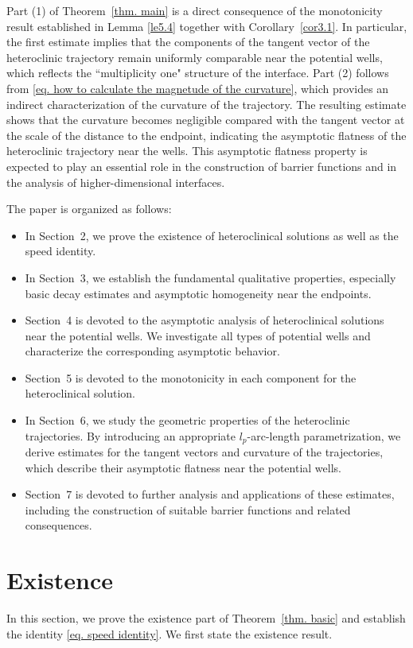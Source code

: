 \documentclass[11pt,twoside,reqno]{amsart}
\numberwithin{equation}{section}
\begin{document}
Part (1) of Theorem~\ref{thm. main} is a direct consequence of the monotonicity result established in Lemma \ref{le5.4} together with Corollary~\ref{cor3.1}. In particular, the first estimate implies that the components of the tangent vector of the heteroclinic trajectory remain uniformly comparable near the potential wells, which reflects the ``multiplicity one" structure of the interface. Part (2) follows from \eqref{eq. how to calculate the magnetude of the curvature}, which provides an indirect characterization of the curvature of the trajectory. The resulting estimate shows that the curvature becomes negligible compared with the tangent vector at the scale of the distance to the endpoint, indicating the asymptotic flatness of the heteroclinic trajectory near the wells. This asymptotic flatness property is expected to play an essential role in the construction of barrier functions and in the analysis of higher-dimensional interfaces.

The paper is organized as follows:
\begin{itemize}
    \item In Section~2, we prove the existence of heteroclinical solutions as well as the speed identity.
    \item In Section~3, we establish the fundamental qualitative properties, especially basic decay estimates and asymptotic homogeneity near the endpoints.
    \item Section~4 is devoted to the asymptotic analysis of heteroclinical solutions near the potential wells. We investigate all types of potential wells and characterize the corresponding asymptotic behavior.
    \item Section~5 is devoted to the monotonicity in each component for the heteroclinical solution.
    \item In Section~6, we study the geometric properties of the heteroclinic trajectories. By introducing an appropriate $l_p$-arc-length parametrization, we derive estimates for the tangent vectors and curvature of the trajectories, which describe their asymptotic flatness near the potential wells.
    \item Section~7 is devoted to further analysis and applications of these estimates, including the construction of suitable barrier functions and related consequences.
\end{itemize}

\section{Existence}
In this section, we prove the existence part of Theorem~\ref{thm. basic} and establish the identity \eqref{eq. speed identity}. We first state the existence result.
\end{document}
